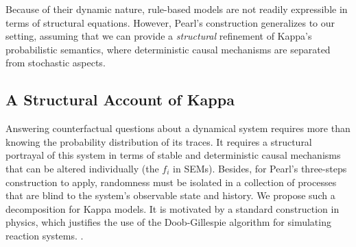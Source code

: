 Because of their dynamic nature, rule-based models are not readily
expressible in terms of structural equations. However, Pearl's
construction generalizes to our setting, assuming that we can provide
a \emph{structural} refinement of Kappa's probabilistic semantics,
where deterministic causal mechanisms are separated from
stochastic aspects.

\iffalse provided that we separate the deterministic causal mechanisms
of a model from its stochastic aspects. This means reinterpreting a
temporal trace as a deterministic function of a separately specifiable
series of mutually independent stochastic choices, allowing us to
reuse the randomness inherent to a specific actual trace in the
construction of counterfactual versions induced by intervention.  \fi

\iffalse Because of their dynamic nature, rule-based
models do not have structural equations that are readily available at
the outset. However, Pearl's construction generalizes to our setting,
provided that we separate the randomness of simulation from its
deterministic causal mechanisms. \fi

\subsection{A Structural Account of Kappa}
\label{subsec:semantics-refinement}

Answering counterfactual questions about a dynamical system requires
more than knowing the probability distribution of its traces. It
requires a structural portrayal of this system in terms of stable and
deterministic causal mechanisms that can be altered individually (the
$f_i$ in SEMs). Besides, for Pearl's three-steps construction to
apply, randomness must be isolated in a collection of processes that
are blind to the system's observable state and history. We
propose such a decomposition for Kappa models. It is motivated by a
standard construction in physics, which justifies the use of the
Doob-Gillespie algorithm for simulating reaction
systems. \cite{gillespie1977exact}.



